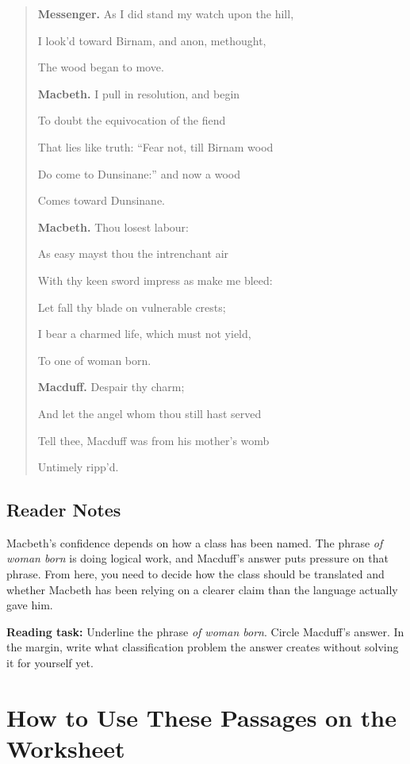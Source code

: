 \documentclass[12pt]{article}
\newenvironment{playpassage}{\begin{quote}\small\setlength{\parskip}{0.25em}}{\end{quote}}
\newcommand{\speaker}[1]{\textbf{#1.}}
\begin{document}
\begin{playpassage}
\speaker{Messenger} As I did stand my watch upon the hill,\par
I look'd toward Birnam, and anon, methought,\par
The wood began to move.

\speaker{Macbeth} I pull in resolution, and begin\par
To doubt the equivocation of the fiend\par
That lies like truth: ``Fear not, till Birnam wood\par
Do come to Dunsinane:'' and now a wood\par
Comes toward Dunsinane.

\speaker{Macbeth} Thou losest labour:\par
As easy mayst thou the intrenchant air\par
With thy keen sword impress as make me bleed:\par
Let fall thy blade on vulnerable crests;\par
I bear a charmed life, which must not yield,\par
To one of woman born.

\speaker{Macduff} Despair thy charm;\par
And let the angel whom thou still hast served\par
Tell thee, Macduff was from his mother's womb\par
Untimely ripp'd.
\end{playpassage}

\subsection*{Reader Notes}

Macbeth's confidence depends on how a class has been named. The phrase \textit{of woman born} is doing logical work, and Macduff's answer puts pressure on that phrase. From here, you need to decide how the class should be translated and whether Macbeth has been relying on a clearer claim than the language actually gave him.

\textbf{Reading task:} Underline the phrase \textit{of woman born}. Circle Macduff's answer. In the margin, write what classification problem the answer creates without solving it for yourself yet.

\section*{How to Use These Passages on the Worksheet}
\end{document}
